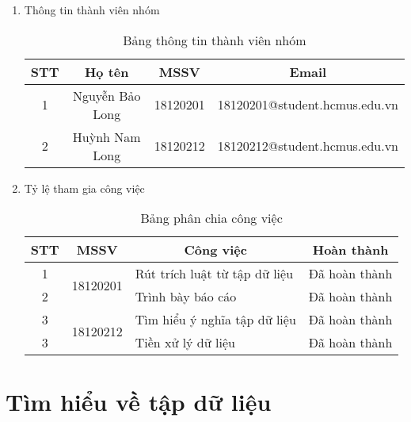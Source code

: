 \documentclass[a4paper, 12pt]{article}
\begin{document}
\begin{enumerate}
    \item Thông tin thành viên nhóm
    \begin{table}[H]
        \begin{center}
            \begin{tabular}{|c|c|c|c|}
            \hline
            STT & Họ tên          & MSSV     & Email                         \\ \hline
            1   & Nguyễn Bảo Long & 18120201 & 18120201@student.hcmus.edu.vn \\ \hline
            2   & Huỳnh Nam Long  & 18120212 & 18120212@student.hcmus.edu.vn         \\ \hline
            \end{tabular}
            \caption{Bảng thông tin thành viên nhóm}
        \end{center}
    \end{table}

    \item Tỷ lệ tham gia công việc
    \begin{table}[H]
        \begin{center}
            \begin{tabular}{|c|c|l|c|}
            \hline
            STT & MSSV                      & \multicolumn{1}{c|}{Công việc} & Hoàn thành \\ \hline
            1   & \multirow{2}{*}{18120201} & Rút trích luật từ tập dữ liệu  & Đã hoàn thành                \\ \cline{1-1} \cline{3-4} 
            2   &                           & Trình bày báo cáo              & Đã hoàn thành                \\ \hline
            3   & \multirow{2}{*}{18120212} & Tìm hiểu ý nghĩa tập dữ liệu   & Đã hoàn thành                \\ \cline{1-1} \cline{3-4} 
            3   &                           & Tiền xử lý dữ liệu             & Đã hoàn thành                \\ \hline
            \end{tabular}
            \caption{Bảng phân chia công việc}
        \end{center}
        \end{table}
\end{enumerate}
\clearpage

\section{Tìm hiểu về tập dữ liệu}
\end{document}
